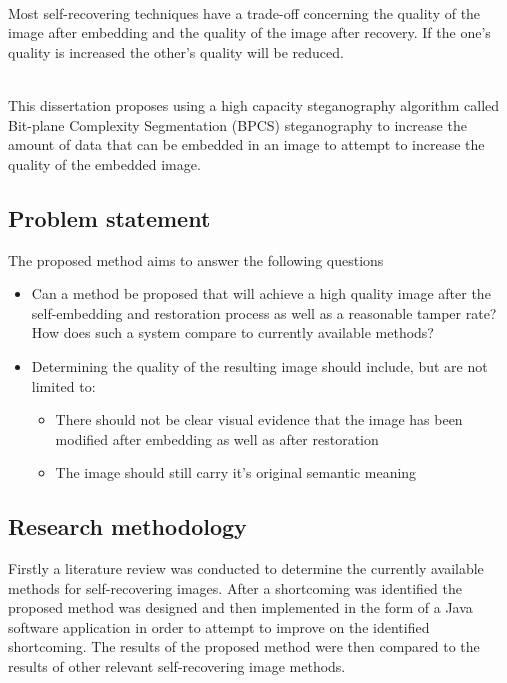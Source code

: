 \documentclass[12pt]{article}
\begin{document}
\hspace{0pt} \\
Most self-recovering techniques have a trade-off concerning the quality of the image after embedding and the quality of the image after recovery.
If the one's quality is increased the other's quality will be reduced.

\hspace{0pt} \\
This dissertation proposes using a high capacity steganography algorithm called Bit-plane Complexity Segmentation (BPCS) steganography to increase the amount of data that can be embedded in an image to attempt to increase the quality of the embedded image.


\subsection{Problem statement}
\label{problemStatement}
The proposed method aims to answer the following questions
\begin{itemize}
	\item Can a method be proposed that will achieve a high quality image after the self-embedding and restoration process as well as a reasonable tamper rate? How does such a system compare to currently available methods?
	\item Determining the quality of the resulting image should include, but are not limited to: 
	\begin{itemize}
		\item There should not be clear visual evidence that the image has been modified after embedding as well as after restoration
		\item The image should still carry it's original semantic meaning
	\end{itemize}
\end{itemize}

\subsection{Research methodology}
Firstly a literature review was conducted to determine the currently available methods for self-recovering images. 
After a shortcoming was identified the proposed method was designed and then implemented in the form of a Java software application in order to attempt to improve on the identified shortcoming. 
The results of the proposed method were then compared to the results of other relevant self-recovering image methods.
\end{document}
